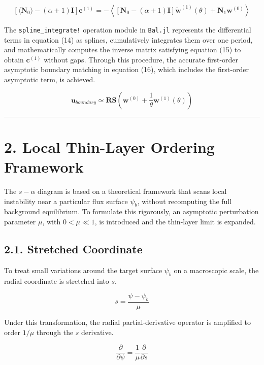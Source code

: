 \documentclass[11pt,a4paper]{article}
\begin{document}
\[ [\langle \mathbf{N}_0 \rangle - (\alpha+1)\mathbf{I}] \mathbf{c}^{(1)} = - \left\langle [\mathbf{N}_0 - (\alpha+1)\mathbf{I}]\tilde{\mathbf{w}}^{(1)}(\theta) + \mathbf{N}_1 \mathbf{w}^{(0)} \right\rangle \tag{15} \]

The \texttt{spline\_integrate!} operation module in \texttt{Bal.jl} represents the
differential terms in equation (14) as splines, cumulatively integrates them over
one period, and mathematically computes the inverse matrix satisfying equation
(15) to obtain \(\mathbf{c}^{(1)}\) without gaps. Through this procedure, the
accurate first-order asymptotic boundary matching in equation (16), which includes
the first-order asymptotic term, is achieved.

\[ \mathbf{u}_{boundary} \simeq \mathbf{R}\mathbf{S} \left( \mathbf{w}^{(0)} + \frac{1}{\theta} \mathbf{w}^{(1)}(\theta) \right) \tag{16} \]

\begin{center}\rule{0.5\linewidth}{0.5pt}\end{center}

\section{2. Local Thin-Layer Ordering Framework}\label{local-thin-layer-ordering-framework}

The \(s-\alpha\) diagram is based on a theoretical framework that scans local
instability near a particular flux surface \(\psi_b\), without recomputing the full
background equilibrium. To formulate this rigorously, an asymptotic perturbation
parameter \(\mu\), with \(0 < \mu \ll 1\), is introduced and the thin-layer limit is
expanded.

\subsection{2.1. Stretched Coordinate}\label{stretched-coordinate}

To treat small variations around the target surface \(\psi_b\) on a macroscopic
scale, the radial coordinate is stretched into \(s\).

\[ s = \frac{\psi - \psi_b}{\mu} \tag{17} \]

Under this transformation, the radial partial-derivative operator is amplified to
order \(1/\mu\) through the \(s\) derivative.

\[ \frac{\partial}{\partial\psi} = \frac{1}{\mu} \frac{\partial}{\partial s} \tag{18} \]
\end{document}
